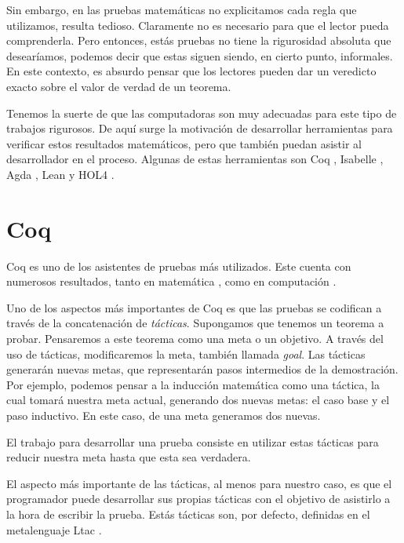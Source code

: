 Sin embargo, en las pruebas matemáticas no explicitamos cada regla que utilizamos, resulta tedioso.
Claramente no es necesario para que el lector pueda comprenderla.
Pero entonces, estás pruebas no tiene la rigurosidad absoluta que desearíamos, podemos decir que estas siguen siendo, en cierto punto, informales.
En este contexto, es absurdo pensar que los lectores pueden dar un veredicto exacto sobre el valor de verdad de un teorema.

Tenemos la suerte de que las computadoras son muy adecuadas para este tipo de trabajos rigurosos. De aquí surge la motivación de desarrollar herramientas para verificar estos resultados matemáticos, pero que también puedan asistir al desarrollador en el proceso. Algunas de estas herramientas son Coq \cite{CIC}, Isabelle \cite{DBLP:books/sp/NipkowPW02}, Agda \cite{DBLP:conf/tphol/BoveDN09}, Lean \cite{DBLP:conf/cade/MouraKADR15} y HOL4 \cite{DBLP:conf/tphol/SlindN08}.

\section{Coq}

Coq es uno de los asistentes de pruebas más utilizados.
Este cuenta con numerosos resultados, tanto en matemática \cite{DBLP:conf/ascm/Gonthier07}, como en computación \cite{DBLP:journals/pacmpl/0002JKD18}.

Uno de los aspectos más importantes de Coq es que las pruebas se codifican a través de la concatenación de \emph{tácticas}.
Supongamos que tenemos un teorema a probar.
Pensaremos a este teorema como una meta o un objetivo.
A través del uso de tácticas, modificaremos la meta, también llamada \emph{goal}.
Las tácticas generarán nuevas metas, que representarán pasos intermedios de la demostración.
Por ejemplo, podemos pensar a la inducción matemática como una táctica, la cual tomará nuestra meta actual, generando dos nuevas metas: el caso base y el paso inductivo. En este caso, de una meta generamos dos nuevas.

El trabajo para desarrollar una prueba consiste en utilizar estas tácticas para reducir nuestra meta hasta que esta sea verdadera.

El aspecto más importante de las tácticas, al menos para nuestro caso, es que el programador puede desarrollar sus propias tácticas con el objetivo de asistirlo a la hora de escribir la prueba.
Estás tácticas son, por defecto, definidas en el metalenguaje Ltac \cite{DBLP:conf/lpar/Delahaye00}.

